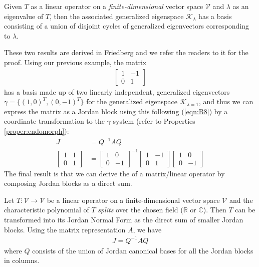 \begin{thm}
\label{thm:B27}
Given $T$ as a linear operator on a \textit{finite-dimensional} vector space $\mathcal{V}$ and $\lambda$ as an eigenvalue of $T$, then the associated generalized eigenspace $\mathcal{K}_\lambda$ has a basis consisting of a union of disjoint cycles of generalized eigenvectors corresponding to $\lambda$.
\end{thm}
These two results are derived in Friedberg and we refer the readers to it for the proof. Using our previous example, the matrix
\begin{align*}
\begin{bmatrix}
1 & -1 \\
0 & 1
\end{bmatrix}    
\end{align*}
has a basis made up of two linearly independent, generalized eigenvectors $\gamma = \{(1,0)^T, (0,-1)^T\}$ for the generalized eigenspace $\mathcal{K}_{\lambda=1}$, and thus we can express the matrix as a Jordan block using this  following (\ref{eqn:B8}) by a coordinate transformation to the $\gamma$ system (refer to Properties \ref{proper:endomorph}):
\begin{align*}
J &= Q^{-1}AQ \\
\begin{bmatrix}
1 & 1 \\
0 & 1
\end{bmatrix} 
&=
\begin{bmatrix}
1 & 0 \\
0 & -1
\end{bmatrix}^{-1} 
\begin{bmatrix}
1 & -1 \\
0 & 1
\end{bmatrix} 
\begin{bmatrix}
1 & 0 \\
0 & -1
\end{bmatrix}
\end{align*}
The final result is that we can derive the  of a matrix/linear operator by composing Jordan blocks as a direct sum.
\begin{thm}
Let $T: \mathcal{V} \to \mathcal{V}$ be a linear operator on a finite-dimensional vector space $\mathcal{V}$ and the characteristic polynomial of $T$ \textit{splits} over the chosen field ($\mathbb{R}$ or $\mathbb{C}$). Then $T$ can be transformed into its Jordan Normal Form as the direct sum of smaller Jordan blocks. Using the matrix representation $A$, we have
\begin{align}
J = Q^{-1}AQ
\end{align}
where $Q$ consists of the union of Jordan canonical bases for all the Jordan blocks in columns.
\end{thm}
